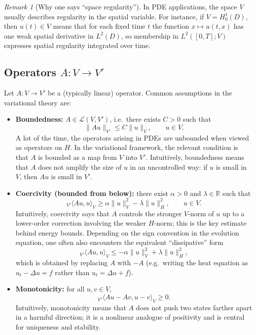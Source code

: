 \documentclass[11pt]{article}
\theoremstyle{definition}
\theoremstyle{remark}
\newtheorem{remark}{Remark}
\newcommand{\dual}[2]{{}_{V'}\langle #1, #2 \rangle_{V}}
\begin{document}
\begin{remark}[Why one says ``space regularity'']
In PDE applications, the space $V$ usually describes regularity in the spatial variable. For
instance, if $V=H_0^1(D)$, then $u(t)\in V$ means that for each fixed time $t$ the function
$x\mapsto u(t,x)$ has one weak spatial derivative in $L^2(D)$, so membership in
$L^2([0,T];V)$ expresses spatial regularity integrated over time.
\end{remark}

\subsection*{Operators $A:V\to V'$}

Let $A:V\to V'$ be a (typically linear) operator. Common assumptions in the variational theory are:
\begin{itemize}
  \item \textbf{Boundedness:} $A\in \mathcal{L}(V,V')$, i.e.\ there exists $C>0$ such that
  \[
  \|Au\|_{V'}\le C\|u\|_V,
  \qquad
  u\in V.
  \]
  A lot of the time, the operators arising in PDEs are unbounded when viewed as operators on $H$.
  In the variational framework, the relevant condition is that $A$ is bounded as a map from $V$
  into $V'$.
  Intuitively, boundedness means that $A$ does not amplify the size of $u$ in an uncontrolled
  way: if $u$ is small in $V$, then $Au$ is small in $V'$.
  \item \textbf{Coercivity (bounded from below):} there exist $\alpha>0$ and $\lambda\in\mathbb{R}$ such that
  \[
  \dual{Au}{u}\ge \alpha\|u\|_V^2-\lambda\|u\|_H^2,
  \qquad
  u\in V.
  \]
  Intuitively, coercivity says that $A$ controls the stronger $V$-norm of $u$ up to a lower-order
  correction involving the weaker $H$-norm; this is the key estimate behind energy bounds.
  Depending on the sign convention in the evolution equation, one often also encounters the equivalent
  ``dissipative'' form
  \[
  \dual{Au}{u}\le -\alpha\|u\|_V^2+\lambda\|u\|_H^2,
  \]
  which is obtained by replacing $A$ with $-A$ (e.g.\ writing the heat equation as $u_t-\Delta u=f$ rather than $u_t=\Delta u+f$).
  \item \textbf{Monotonicity:} for all $u,v\in V$,
  \[
  \dual{Au-Av}{u-v}\ge 0.
  \]
  Intuitively, monotonicity means that $A$ does not push two states farther apart in a harmful
  direction; it is a nonlinear analogue of positivity and is central for uniqueness and stability.
\end{itemize}
\end{document}
